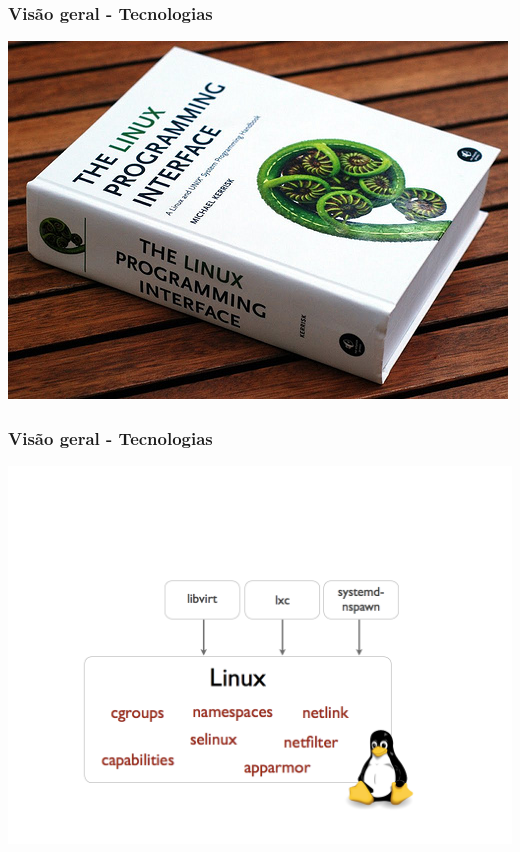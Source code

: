 \documentclass{beamer}
\begin{document}
\begin{frame}
    \frametitle{Visão geral - Tecnologias}
    \centering
    \includegraphics[width=0.8\linewidth]{img/the-linux-programming-interface.jpg}
\end{frame}

\begin{frame}
    \frametitle{Visão geral - Tecnologias}
    \centering
    \includegraphics[width=1\linewidth]{img/docker_diagram_lxc.png}
\end{frame}
\end{document}
